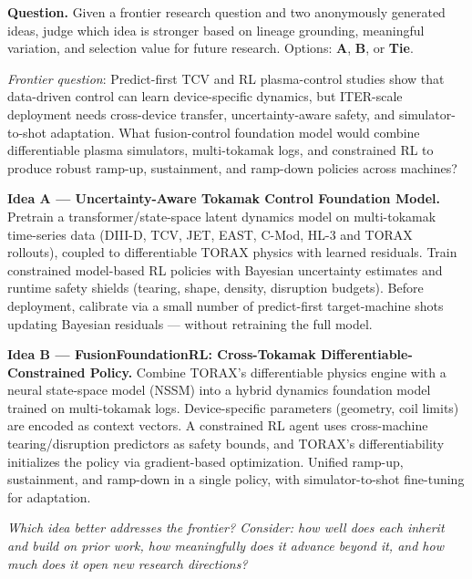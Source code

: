 \begin{tcolorbox}[
    breakable,
    title={Example of \genearena{} · Pairwise Idea Battle (Physics / Fusion Plasma Control)},
    colback=LighterGray,
    colframe=DeepPurple,
    colbacktitle=DeepPurple,
    coltitle=White,
]
\textbf{\textcolor{CaseOrange}{Question.}} Given a frontier research question and two anonymously generated ideas, judge which idea is stronger based on lineage grounding, meaningful variation, and selection value for future research. Options: \textbf{A}, \textbf{B}, or \textbf{Tie}.

\medskip
\textit{Frontier question}: Predict-first TCV and RL plasma-control studies show that data-driven control can learn device-specific dynamics, but ITER-scale deployment needs cross-device transfer, uncertainty-aware safety, and simulator-to-shot adaptation. What fusion-control foundation model would combine differentiable plasma simulators, multi-tokamak logs, and constrained RL to produce robust ramp-up, sustainment, and ramp-down policies across machines?

\medskip
\textbf{Idea A — Uncertainty-Aware Tokamak Control Foundation Model.}
Pretrain a transformer/state-space latent dynamics model on multi-tokamak time-series data (DIII-D, TCV, JET, EAST, C-Mod, HL-3 and TORAX rollouts), coupled to differentiable TORAX physics with learned residuals. Train constrained model-based RL policies with Bayesian uncertainty estimates and runtime safety shields (tearing, shape, density, disruption budgets). Before deployment, calibrate via a small number of predict-first target-machine shots updating Bayesian residuals — without retraining the full model.

\medskip
\textbf{Idea B — FusionFoundationRL: Cross-Tokamak Differentiable-Constrained Policy.}
Combine TORAX's differentiable physics engine with a neural state-space model (NSSM) into a hybrid dynamics foundation model trained on multi-tokamak logs. Device-specific parameters (geometry, coil limits) are encoded as context vectors. A constrained RL agent uses cross-machine tearing/disruption predictors as safety bounds, and TORAX's differentiability initializes the policy via gradient-based optimization. Unified ramp-up, sustainment, and ramp-down in a single policy, with simulator-to-shot fine-tuning for adaptation.

\medskip
\textit{Which idea better addresses the frontier? Consider: how well does each inherit and build on prior work, how meaningfully does it advance beyond it, and how much does it open new research directions?}
\end{tcolorbox}

